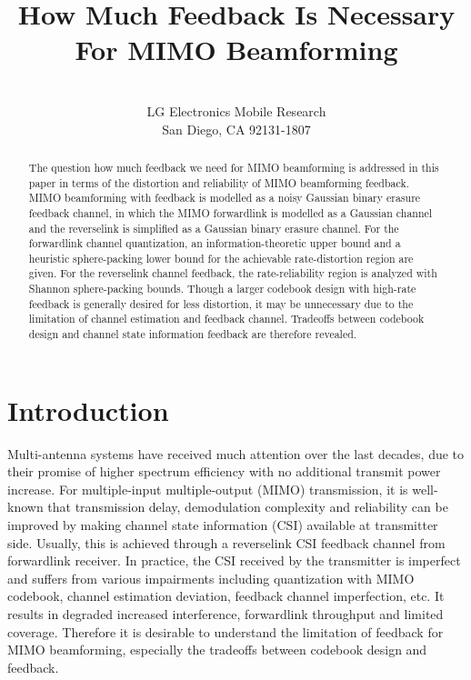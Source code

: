 \documentclass[10pt,fleqn, twocolumn]{IEEEtran}
\title{How Much Feedback Is Necessary For MIMO Beamforming}
\author{\\LG Electronics Mobile Research\\San Diego, CA 92131-1807}
\date{}
\begin{document}
\maketitle
\begin{abstract}\small
The question how much feedback we need for MIMO beamforming is
addressed in this paper in terms of the distortion and reliability
of MIMO beamforming feedback. MIMO beamforming with feedback is
modelled as a noisy Gaussian binary erasure feedback channel, in
which the MIMO forwardlink is modelled as a Gaussian channel and
the reverselink is simplified as a Gaussian binary erasure
channel. For the forwardlink channel quantization, an
information-theoretic upper bound and a heuristic sphere-packing
lower bound for the achievable rate-distortion region are given.
For the reverselink channel feedback, the rate-reliability region
is analyzed with Shannon sphere-packing bounds. Though a larger
codebook design with high-rate feedback is generally desired for
less distortion, it may be unnecessary due to the limitation of
channel estimation and feedback channel. Tradeoffs between
codebook design and channel state information feedback are
therefore revealed.
\end{abstract}

\section{Introduction}
Multi-antenna systems have received much attention over the last
decades, due to their promise of higher spectrum efficiency with
no additional transmit power increase. For multiple-input
multiple-output (MIMO) transmission, it is well-known that
transmission delay, demodulation complexity and reliability can be
improved by making channel state information (CSI) available at
transmitter side. Usually, this is achieved through a reverselink
CSI feedback channel from forwardlink receiver. In practice, the
CSI received by the transmitter is imperfect and suffers from
various impairments including quantization with MIMO codebook,
channel estimation deviation, feedback channel imperfection, etc.
It results in degraded increased interference, forwardlink
throughput and limited coverage. Therefore it is desirable to
understand the limitation of feedback for MIMO beamforming,
especially the tradeoffs between codebook design and feedback.
\end{document}
